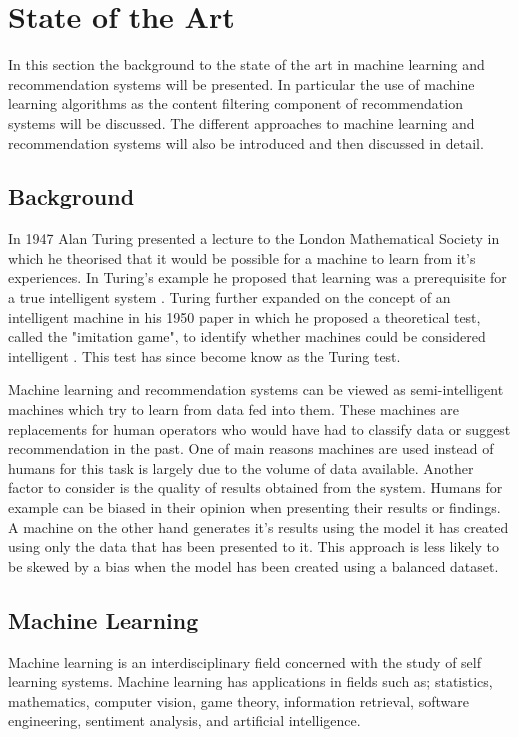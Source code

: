 \chapter{State of the Art}

In this section the background to the state of the art in machine learning and recommendation systems will be presented.
In particular the use of machine learning algorithms as the content filtering component of recommendation systems will be discussed.
The different approaches to machine learning and recommendation systems will also be introduced and then discussed in detail.

\section{Background}
In 1947 Alan Turing presented a lecture to the London Mathematical Society in which he theorised that it would be possible for a machine to learn from it's experiences.
In Turing's example he proposed that learning was a prerequisite for a true intelligent system \cite{Turing1946}.
Turing further expanded on the concept of an intelligent machine in his 1950 paper in which he proposed a theoretical test, called the "imitation game", to identify whether machines could be considered intelligent \cite{Turing1950}.
This test has since become know as the Turing test.

Machine learning and recommendation systems can be viewed as semi-intelligent machines which try to learn from data fed into them.
These machines are replacements for human operators who would have had to classify data or suggest recommendation in the past.
One of main reasons machines are used instead of humans for this task is largely due to the volume of data available.
Another factor to consider is the quality of results obtained from the system.
Humans for example can be biased in their opinion when presenting their results or findings.
A machine on the other hand generates it's results using the model it has created using only the data that has been presented to it.
This approach is less likely to be skewed by a bias when the model has been created using a balanced dataset\cite{FProvost2000}.

\section{Machine Learning}
Machine learning is an interdisciplinary field concerned with the study of self learning systems.
Machine learning has applications in fields such as; statistics, mathematics, computer vision, game theory, information retrieval, software engineering, sentiment analysis, and artificial intelligence.


